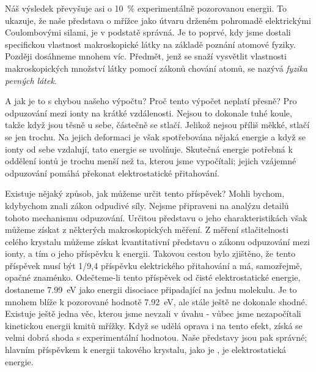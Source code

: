     Náš výsledek převyšuje asi o \SI{10}{\percent} experimentálně pozorovanou energii. To ukazuje,
    že naše představa o mřížce jako útvaru drženém pohromadě elektrickými Coulombovými silami, je v
    podstatě správná. Je to poprvé, kdy jsme dostali specifickou vlastnost makroskopické látky na
    základě po­znání atomové fyziky. Později dosáhneme mnohem víc. Předmět, jenž se snaží vysvětlit
    vlastnosti makroskopických množství látky pomocí zákonů chování atomů, se nazývá \emph{fyzika
    pevných látek}.

    A jak je to s chybou našeho výpočtu? Proč tento výpočet neplatí přesně? Pro odpuzování mezi
    ionty na krátké vzdálenosti. Nejsou to dokonale tuhé koule, takže když jsou těsně u sebe,
    částečně se stlačí. Jelikož nejsou příliš měkké, stlačí se jen trochu. Na jejich deformaci je
    však spotřebována nějaká energie a když se ionty od sebe vzdalují, tato energie se uvolňuje.
    Skutečná energie potřebná k oddělení iontů je trochu menší než ta, kterou jsme vypočítali;
    jejich vzájemné odpuzování pomáhá překonat elektrostatické přitahování.

    Existuje nějaký způsob, jak můžeme určit tento příspěvek? Mohli bychom, kdybychom znali zákon
    odpudivé síly. Nejsme připraveni na analýzu detailů tohoto mechanismu odpuzování. Určitou
    představu o jeho charakteristikách však můžeme získat z některých makroskopických měření. Z
    měření stlačitelnosti celého krystalu můžeme získat kvantitativní představu o zákonu odpuzování
    mezi ionty, a tím o jeho příspěvku k energii. Takovou cestou bylo zjištěno, že tento příspěvek
    musí být 1/9,4 příspěvku elektrického přitahování a má, samozřejmě, opačné znaménko. Odečteme-li
    tento příspěvek od čisté elektrostatické energie, dostaneme \SI{7.99}{\electronvolt} jako
    energii disociace připadající na jednu molekulu. Je to mnohem blíže k pozorované hodnotě
    \SI{7.92}{\electronvolt}, ale stále ještě ne dokonale shodné. Existuje ještě jedna věc, kterou
    jsme nevzali v úvahu - vůbec jsme nezapočítali kinetickou energii kmitů mřížky. Když se udělá
    oprava i na tento efekt, získá se velmi dobrá shoda s experimentální hodnotou. Naše představy
    jsou pak správné; hlavním příspěvkem k energii takového krystalu, jako je , je
    elektrostatická energie.

